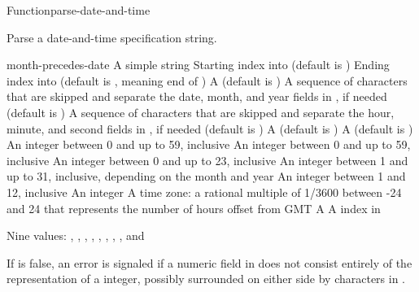 \documentclass[10pt,twoside,english,pdftex]{article}
\begin{document}
\begin{functiondoc}{Function}{parse-date-and-time}{%
     
    }
% 

\fnsyntax

\fnpurpose Parse a date-and-time specification string.

\fnpackage {} 

\fnmodule {}

\fnargs
\begin{args}{month-precedes-date}
\arg[string] A simple string
\arg[start] Starting index into  (default is )
\arg[end] Ending index into  (default is \nil, meaning
end of )
 A  (default is \nil)
 A sequence of characters that are skipped and separate the
 date, month, and year fields in , if needed (default is 
 )
 A sequence of characters that are skipped and separate the
 hour, minute, and second fields in , if needed (default is 
 )
 A  (default is 
)
 A  (default is \nil)
\arg[second] An integer between 0 and up to 59, inclusive
\arg[minute] An integer between 0 and up to 59, inclusive
\arg[hour] An integer between 0 and up to 23, inclusive
\arg[date] An integer between 1 and up to 31, inclusive, depending
  on the month and year
\arg[month] An integer between 1 and 12, inclusive
\arg[year] An integer
 A time zone: a rational multiple of 1/3600 between
 -24 and 24 that represents the number of hours offset from GMT
 A 
\arg[position] A index in 
\end{args}

\fnreturns Nine values: , , , ,
, , ,
, and 

\fnerrors
%
If  is false, an error is signaled if a numeric field in
 does not consist entirely of the representation of a integer,
possibly surrounded on either side by characters in .


\end{functiondoc}
\end{document}

